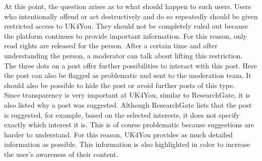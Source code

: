 At this point, the question arises as to what should happen to such users.
Users who intentionally offend or act destructively and do so repeatedly should be given restricted access to UK4You.
They should not be completely ruled out because the platform continues to provide important information.
For this reason, only read rights are released for the person.
After a certain time and after understanding the person, a moderator can talk about lifting this restriction.\\

The three dots on a post offer further possibilities to interact with this post.
Here the post can also be flagged as problematic and sent to the moderation team.
It should also be possible to hide the post or avoid further posts of this type.\\

Since transparency is very important at UK4You, similar to ResearchGate, it is also listed why a post was suggested.
Although ResearchGate lists that the post is suggested, for example, based on the selected interests, it does not specify exactly which interest it is.
This is of course problematic because suggestions are harder to understand. 
For this reason, UK4You provides as much detailed information as possible.
This information is also highlighted in color to increase the user's awareness of their content.\\


